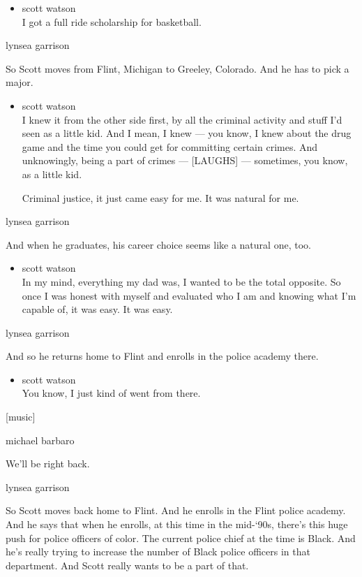 \begin{itemize}
\tightlist
\item
  scott watson\\
  I got a full ride scholarship for basketball.
\end{itemize}

lynsea garrison

So Scott moves from Flint, Michigan to Greeley, Colorado. And he has to
pick a major.

\begin{itemize}
\item
  scott watson\\
  I knew it from the other side first, by all the criminal activity and
  stuff I'd seen as a little kid. And I mean, I knew --- you know, I
  knew about the drug game and the time you could get for committing
  certain crimes. And unknowingly, being a part of crimes ---
  {[}LAUGHS{]} --- sometimes, you know, as a little kid.

  Criminal justice, it just came easy for me. It was natural for me.
\end{itemize}

lynsea garrison

And when he graduates, his career choice seems like a natural one, too.

\begin{itemize}
\tightlist
\item
  scott watson\\
  In my mind, everything my dad was, I wanted to be the total opposite.
  So once I was honest with myself and evaluated who I am and knowing
  what I'm capable of, it was easy. It was easy.
\end{itemize}

lynsea garrison

And so he returns home to Flint and enrolls in the police academy there.

\begin{itemize}
\tightlist
\item
  scott watson\\
  You know, I just kind of went from there.
\end{itemize}

{[}music{]}

michael barbaro

We'll be right back.

lynsea garrison

So Scott moves back home to Flint. And he enrolls in the Flint police
academy. And he says that when he enrolls, at this time in the mid-`90s,
there's this huge push for police officers of color. The current police
chief at the time is Black. And he's really trying to increase the
number of Black police officers in that department. And Scott really
wants to be a part of that.

